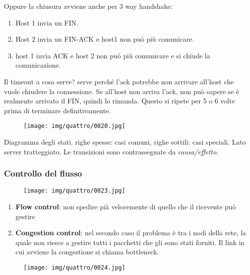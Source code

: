 \documentclass{article}
\begin{document}
\noindent Oppure la chiusura avviene anche per 3 way handshake:\begin{enumerate}
    \item Host 1 invia un FIN.
    \item Host 2 invia un FIN-ACK e host1 non può più comunicare.
    \item host 1 invia ACK e host 2 non può più comunicare e si chiude la comunicazione.
\end{enumerate}

\noindent Il timeout a cosa serve? serve perché l'ack potrebbe non arrivare all'host che vuole chiudere la connessione. Se all'host
non arriva l'ack, non può sapere se è realmente arrivato il FIN, quindi lo rimanda. Questo si ripete per 5 o 6 volte prima di terminare 
definitivamente.

\begin{figure}[!ht]
    \begin{center}
        \texttt{[image: img/quattro/0020.jpg]}         
    \end{center}
\end{figure}
\noindent Diagramma degli stati. righe spesse: casi comuni, righe sottili: casi speciali. Lato server tratteggiato. 
Le transizioni sono contrassegnate da \textit{causa/effetto}.

\subsubsection{Controllo del flusso}
\begin{figure}[!ht]
    \begin{center}
        \texttt{[image: img/quattro/0023.jpg]}         
    \end{center}
\end{figure}
\begin{enumerate}
    \item \textbf{Flow control}: non spedire pià velocemente di quello che il ricevente può gestire
    \item \textbf{Congestion control}: nel secondo caso il problema è tra i nodi della rete, la quale non riesce a gestire 
    tutti i pacchetti che gli sono stati forniti. Il link in cui avviene la congestione si chiama bottleneck.
\end{enumerate}

\begin{figure}[!ht]
    \begin{center}
        \texttt{[image: img/quattro/0024.jpg]}         
    \end{center}
\end{figure}
\end{document}
